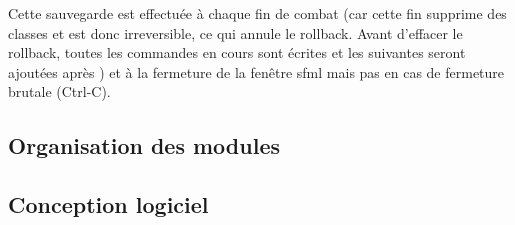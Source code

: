 \documentclass[a4paper,12pt]{article}
\begin{document}
Cette sauvegarde est effectuée à chaque fin de combat (car cette fin supprime des classes et est donc irreversible, ce qui annule le rollback. Avant d'effacer le rollback, toutes les commandes en cours sont écrites et les suivantes seront ajoutées après ) et à la fermeture de la fenêtre sfml mais pas en cas de fermeture brutale (Ctrl-C).

\subsection{Organisation des modules}

\clearpage
\subsection{Conception logiciel}


%
\end{document}
